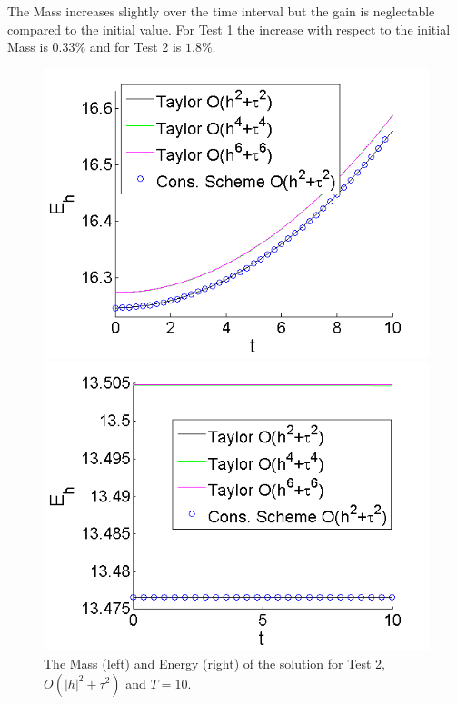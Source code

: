\documentclass[%
 aip,
cp,  
 amsmath,amssymb,
 reprint,
]{iopconfser}
\begin{document}
The Mass increases slightly over the time interval but the gain is neglectable compared to the initial value. For Test 1 the increase with respect to the initial Mass is $0.33\%$ and for Test 2 is $1.8\%$.

\begin{figure}[ht]\vspace{0.2cm}
	\begin{minipage}[b]{0.4\linewidth}
		 \includegraphics[width=\linewidth]{Mass_bt1_c090_h010_Taylor_Conservative.png}
	\end{minipage}	
	\begin{minipage}[b]{0.4\linewidth}
		\includegraphics[width=\linewidth]{Energy_bt1_c090_h010_Taylor_Conservative.png}
		
	\end{minipage}
\caption{The Mass (left) and Energy (right) of the solution for Test 2, $O(|h|^2 + \tau^2)$ and $T=10$.}
\label{Test2En}
\end{figure}
\end{document}
